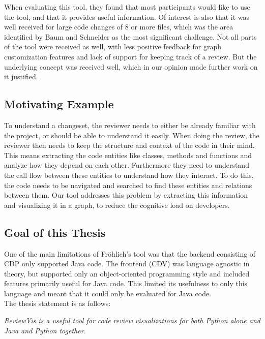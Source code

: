 \documentclass[a4paper,11pt,twoside]{article}
\theoremstyle{definition} %
\begin{document}
When evaluating this tool, they found that most participants would like to use the tool, and that it provides useful information. Of interest is also that it was well received for large code changes of 8 or more files, which was the area identified by Baum and Schneider as the most significant challenge. Not all parts of the tool were received as well, with less positive feedback for graph customization features and lack of support for keeping track of a review. But the underlying concept was received well, which in our opinion made further work on it justified.


\subsection{Motivating Example} \label{MotivatingExample}
To understand a changeset, the reviewer needs to either be already familiar with the project, or should be able to understand it easily. When doing the review, the reviewer then needs to keep the structure and context of the code in their mind. This means extracting the code entities like classes, methods and functions and analyze how they depend on each other. Furthermore they need to understand the call flow between these entities to understand how they interact. To do this, the code needs to be navigated and searched to find these entities and relations between them. Our tool addresses this problem by extracting this information and visualizing it in a graph, to reduce the cognitive load on developers.


\subsection{Goal of this Thesis} \label{SubSec:DescGoal}
One of the main limitations of Fröhlich's tool was that the backend consisting of CDP only supported Java code. The frontend (CDV) was language agnostic in theory, but supported only an object-oriented programming style and included features primarily useful for Java code. This limited its usefulness to only this language and meant that it could only be evaluated for Java code.
\\

The thesis statement is as follows:

\begin{displayquote}\textit{ReviewVis is a useful tool for code review visualizations for both Python alone and Java and Python together.}
\end{displayquote}
\end{document}
